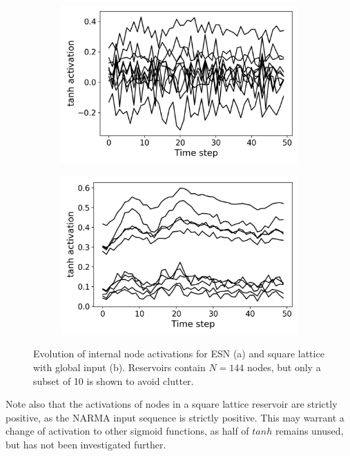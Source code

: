 \begin{figure}[htb]
  \centering
  \begin{subfigure}{.49\textwidth}
    \centering
    \includegraphics[width=1.0\linewidth]{figures/esn-activations.png}
    \caption{}
    \label{fig:activations-a}
  \end{subfigure}
  \begin{subfigure}{.49\textwidth}
    \centering
    \includegraphics[width=1.0\linewidth]{figures/sq-activations.png}
    \caption{}
    \label{fig:activations-b}
  \end{subfigure}
  \caption{
    Evolution of internal node activations for ESN (a) and square lattice with
global input (b). Reservoirs contain $N = 144$ nodes, but only a subset of 10 is
shown to avoid clutter.
  }
  \label{fig:activations}
\end{figure}

Note also that the activations of nodes in a square lattice reservoir are
strictly positive, as the NARMA input sequence is strictly positive. This may
warrant a change of activation to other sigmoid functions, as half of $tanh$
remains unused, but has not been investigated further.

